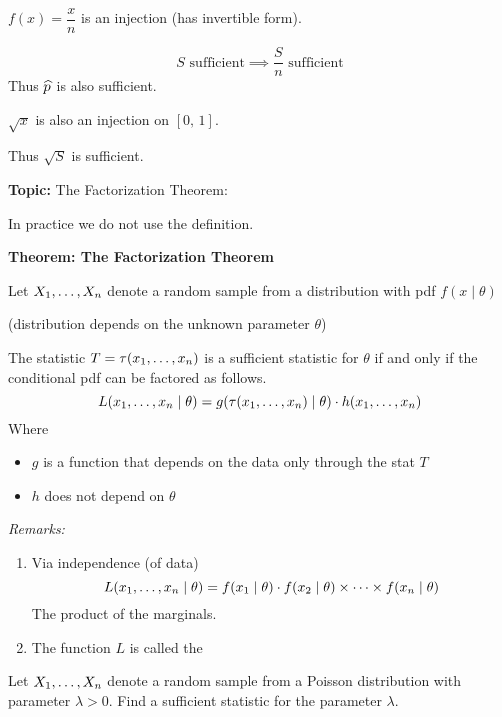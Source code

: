 \example $f(x) = \dfrac{x}{n}$ is an injection (has invertible form).

$$S \text{ sufficient} \implies \frac{S}{n} \text{ sufficient}$$
Thus $\widehat{p}$ is also sufficient.

\example $\sqrt{x}$ is also an injection on $[0,\,1]$.

\nl Thus $\sqrt{S}$ is sufficient.

\nnl \textbf{Topic:} The Factorization Theorem:

\nl \color{red}In practice we do not use the definition.\color{black}

\nl \textbf{Theorem: The Factorization Theorem}


\nl Let ${X}_1, \dots, {X}_n$ denote a random sample from a distribution with pdf $f(x \mid \theta)$

\nl \color{orange}(distribution depends on the unknown parameter $\theta$)\color{black}

\nnl The statistic $T = \tau({x}_1, \dots, {x}_n)$
is a sufficient statistic for $\theta$ if and only if the conditional pdf can be factored as follows.
$$L({x}_1, \dots, {x}_n \mid \theta) = g(\tau({x}_1, \dots, {x}_n) \mid \theta) \cdot h({x}_1, \dots, {x}_n)$$
Where
\begin{itemize}
    \item $g$ is a function that depends on the data only through the stat $T$
    \item $h$ does not depend on $\theta$
\end{itemize}

\nnl\textit{Remarks:}
\begin{enumerate}[label=\textcircled{\raisebox{-1pt}{\arabic*}}]
    \item Via independence (of data)
    $$L({x}_1, \dots, {x}_n \mid \theta) = f(x_1 \mid \theta) \cdot f(x_2 \mid \theta) \times \cdots \times f(x_n \mid \theta)$$
    The product of the marginals.
    \vspace{.2in}
    \item The function $L$ is called the 
\end{enumerate}

\example Let ${X}_1, \dots, {X}_n$ denote a random sample from a Poisson distribution with parameter $\lambda > 0$. Find a sufficient statistic for the parameter $\lambda$.

